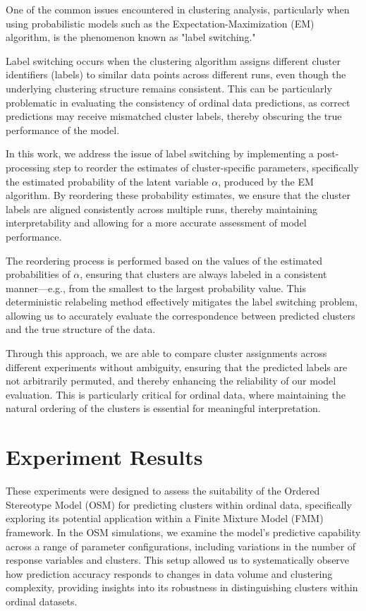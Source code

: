 \documentclass{article}
\begin{document}
One of the common issues encountered in clustering analysis, 
particularly when using probabilistic models such as the Expectation-Maximization (EM) algorithm, 
is the phenomenon known as "label switching." 

Label switching occurs when the clustering algorithm assigns different cluster identifiers (labels) to similar data points across different runs, 
even though the underlying clustering structure remains consistent. 
This can be particularly problematic in evaluating the consistency of ordinal data predictions, 
as correct predictions may receive mismatched cluster labels, 
thereby obscuring the true performance of the model.

In this work, we address the issue of label switching by implementing a post-processing step to reorder the estimates of cluster-specific parameters, 
specifically the estimated probability of the latent variable 
$\alpha$, produced by the EM algorithm. By reordering these probability estimates, 
we ensure that the cluster labels are aligned consistently across multiple runs, 
thereby maintaining interpretability and allowing for a more accurate assessment of model performance.

The reordering process is performed based on the values of the estimated probabilities of 
$\alpha$, ensuring that clusters are always labeled in a consistent manner—e.g., 
from the smallest to the largest probability value. 
This deterministic relabeling method effectively mitigates the label switching problem, 
allowing us to accurately evaluate the correspondence between predicted clusters and the true structure of the data.

Through this approach, we are able to compare cluster assignments across different experiments without ambiguity, 
ensuring that the predicted labels are not arbitrarily permuted, and thereby enhancing the reliability of our model evaluation. 
This is particularly critical for ordinal data, where maintaining the natural ordering of the clusters is essential for meaningful interpretation.


\section{Experiment Results}

These experiments were designed to assess the suitability of the Ordered Stereotype Model (OSM) for predicting clusters within ordinal data, specifically exploring its potential application within a Finite Mixture Model (FMM) framework. In the OSM simulations, we examine the model’s predictive capability across a range of parameter configurations, including variations in the number of response variables and clusters. This setup allowed us to systematically observe how prediction accuracy responds to changes in data volume and clustering complexity, providing insights into its robustness in distinguishing clusters within ordinal datasets.
\end{document}

